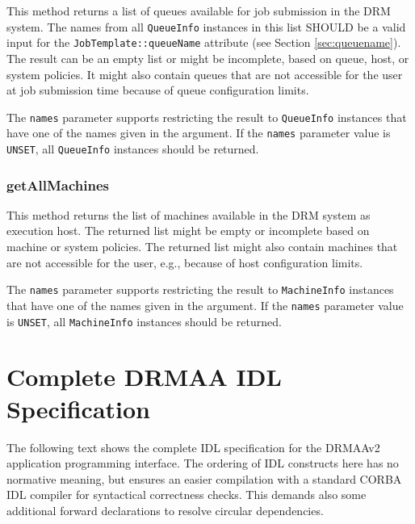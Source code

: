 \documentclass{article}
\newcommand{\h}[1]{\lstinline|#1|}
\begin{document}
This method returns a list of queues available for job submission in the DRM system. The names from all \h{QueueInfo} instances in this list SHOULD be a valid input for the \h{JobTemplate::queueName} attribute (see Section \ref{sec:queuename}). The result can be an empty list or might be incomplete, based on queue, host, or system policies. It might also contain queues that are not accessible for the user at job submission time because of queue configuration limits.

The \h{names} parameter supports restricting the result to \h{QueueInfo} instances that have one of the names given in the argument. If the \h{names} parameter value is \h{UNSET}, all \h{QueueInfo} instances should be returned.

\subsubsection{getAllMachines}

This method returns the list of machines available in the DRM system as execution host. The returned list might be empty or incomplete based on machine or system policies. The returned list might also contain machines that are not accessible for the user, e.g., because of host configuration limits.

The \h{names} parameter supports restricting the result to \h{MachineInfo} instances that have one of the names given in the argument. If the \h{names} parameter value is \h{UNSET}, all \h{MachineInfo} instances should be returned.

\section{Complete DRMAA IDL Specification}
\label{sec:idl}

The following text shows the complete IDL specification for the DRMAAv2 application programming interface. The ordering of IDL constructs here has no normative meaning, but ensures an easier compilation with a standard CORBA IDL compiler for syntactical correctness checks. This demands also some additional forward declarations to resolve circular dependencies.
\end{document}
